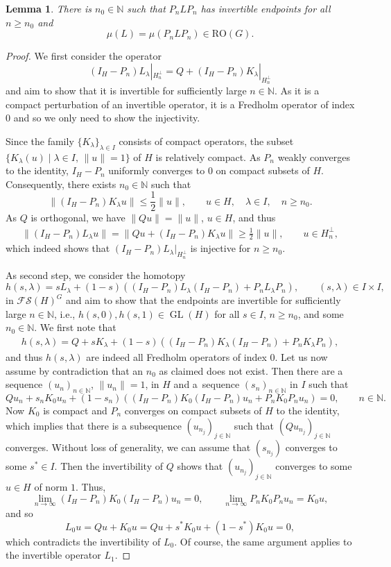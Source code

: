 \documentclass[pdftex]{sigma}
\numberwithin{equation}{section}
\newtheorem{Lemma}[Theorem]{Lemma}
\theoremstyle{definition}
\DeclareMathOperator{\GL}{GL}
\begin{document}
\begin{Lemma}
There is $n_0\in\mathbb{N}$ such that $P_n LP_n$ has invertible endpoints for all $n\geq n_0$ and
\[\mu(L)=\mu(P_n LP_n)\in \mathrm{RO}(G).\]
\end{Lemma}

\begin{proof}
We first consider the operator
\[
(I_H-P_n)L_\lambda|_{H^\perp_n}=Q+(I_H-P_n)K_\lambda|_{H^\perp_n}
\]
 and aim to show that it is invertible for sufficiently large $n\in\mathbb{N}$. As it is a compact perturbation of an invertible operator, it is a Fredholm operator of index $0$ and so we only need to show the injectivity.

Since the family $\{K_\lambda\}_{\lambda\in I}$ consists of compact operators, the subset $\{K_\lambda(u) \mid \lambda \in I,\, \|u\|=1\}$ of $H$ is relatively compact. As $P_n$ weakly converges to the identity, $I_H-P_n$ uniformly converges to $0$ on compact subsets of $H$. Consequently, there exists $n_0\in\mathbb{N}$ such that
\[\|(I_H-P_n)K_\lambda u\|\leq\frac{1}{2}\|u\|,\qquad u\in H, \quad \lambda\in I,\quad n\geq n_0.\]
As $Q$ is orthogonal, we have $\|Qu\|=\|u\|$, $u\in H$, and thus
\begin{align*}
\|(I_H-P_n)L_\lambda u\|=\|Qu+(I_H-P_n)K_\lambda u\|\geq\frac{1}{2}\|u\|,\qquad u\in H^\perp_n,
\end{align*}
which indeed shows that $(I_H-P_n)L_\lambda|_{H^\perp_n}$ is injective for $n\geq n_0$.

As second step, we consider the homotopy
\[
h(s,\lambda)=sL_\lambda+(1-s)((I_H-P_n)L_\lambda(I_H-P_n)+P_nL_\lambda P_n),\qquad (s,\lambda)\in I\times I,
\]
in $\mathcal{FS}(H)^G$ and aim to show that the endpoints are invertible for sufficiently large $n\in\mathbb{N}$, i.e., $h(s,0), h(s,1)\in \GL(H)$ for all $s\in I$, $n\geq n_0$, and some $n_0\in\mathbb{N}$. We first note that
\begin{align*}
h(s,\lambda)=Q+sK_\lambda+(1-s)((I_H-P_n)K_\lambda(I_H-P_n)+P_nK_\lambda P_n),
\end{align*}
and thus $h(s,\lambda)$ are indeed all Fredholm operators of index $0$. Let us now assume by contradiction that an $n_0$ as claimed does not exist. Then there are a sequence $(u_n)_{n\in\mathbb{N}}$, $\|u_n\|=1$, in $H$ and a~sequence $(s_n)_{n\in\mathbb{N}}$ in $I$ such that
\[Qu_n+s_nK_0u_n+(1-s_n)((I_H-P_n)K_0(I_H-P_n)u_n+P_nK_0 P_nu_n)=0,\qquad n\in\mathbb{N}.\]
Now $K_0$ is compact and $P_n$ converges on compact subsets of $H$ to the identity, which implies that there is a subsequence $(u_{n_j})_{j\in\mathbb{N}}$ such that $(Qu_{n_j})_{j\in\mathbb{N}}$ converges. Without loss of generality, we can assume that $(s_{n_j})$ converges to some $s^\ast\in I$. Then the invertibility of $Q$ shows that $(u_{n_j})_{j\in\mathbb{N}}$ converges to some $u\in H$ of norm $1$. Thus,
\[\lim_{n\rightarrow\infty} (I_H-P_n)K_0(I_H-P_n)u_n=0,\qquad \lim_{n\rightarrow\infty}P_nK_0 P_n u_n=K_0 u,\]
and so
\[L_0 u=Qu+K_0u=Qu+s^\ast K_0 u+(1-s^\ast)K_0 u=0,\]
which contradicts the invertibility of $L_0$. Of course, the same argument applies to the invertible operator $L_1$.


\end{proof}
\end{document}
